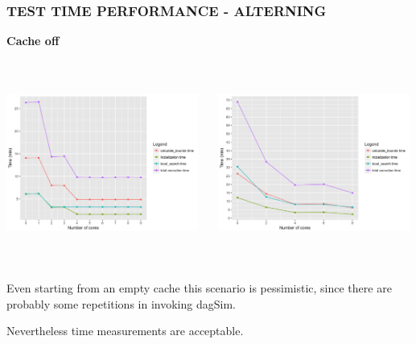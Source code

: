 \documentclass[10pt, compress]{beamer}
\begin{document}
\begin{frame}[fragile]
	\frametitle{TEST TIME PERFORMANCE - ALTERNING}
	
	\textbf{Cache off}
	\begin{columns}[onlytextwidth]
		\hspace{-10 mm}
		\begin{column}{0.5\textwidth}
			\includegraphics[width=6.3cm,height=6cm]{images_ready/test1_150_10_0_no_a.png}
			
		\end{column}
		\hspace{3 mm}
		\begin{column}{0.5\textwidth}
			\includegraphics[width=6.3cm,height=6cm]{images_ready/test9_150_10_0_no_a.png}
			
		\end{column}
	\end{columns}
	Even starting from an empty cache this scenario is pessimistic, since there are probably some repetitions in invoking dagSim.
	
	Nevertheless time measurements are acceptable.
	
\end{frame}
\end{document}
